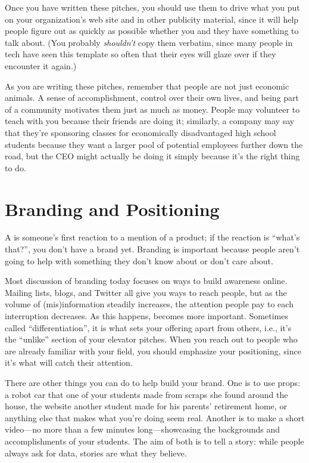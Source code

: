 Once you have written these pitches, you should use them to drive what
you put on your organization's web site and in other publicity material,
since it will help people figure out as quickly as possible whether you
and they have something to talk about. (You probably \emph{shouldn't} copy
them verbatim, since many people in tech have seen this template so
often that their eyes will glaze over if they encounter it again.)

As you are writing these pitches, remember that people are not just
economic animals. A sense of accomplishment, control over their own
lives, and being part of a community motivates them just as much as
money. People may volunteer to teach with you because their friends are
doing it; similarly, a company may say that they're sponsoring classes
for economically disadvantaged high school students because they want a
larger pool of potential employees further down the road, but the CEO
might actually be doing it simply because it's the right thing to do.

\section{Branding and Positioning}\label{s:marketing-branding}

A  is someone's first reaction to a mention
of a product; if the reaction is ``what's that?'', you don't have a brand
yet. Branding is important because people aren't going to help with
something they don't know about or don't care about.

Most discussion of branding today focuses on ways to build awareness
online. Mailing lists, blogs, and Twitter all give you ways to reach
people, but as the volume of (mis)information steadily increases, the
attention people pay to each interruption decreases. As this happens,
 becomes more important.
Sometimes called ``differentiation'', it is what sets your offering apart
from others, i.e., it's the ``unlike'' section of your elevator pitches.
When you reach out to people who are already familiar with your field,
you should emphasize your positioning, since it's what will catch their
attention.

There are other things you can do to help build your brand. One is to
use props: a robot car that one of your students made from scraps she
found around the house, the website another student made for his
parents' retirement home, or anything else that makes what you're
doing seem real. Another is to make a short video---no more than a few
minutes long---showcasing the backgrounds and accomplishments of your
students. The aim of both is to tell a story: while people always ask
for data, stories are what they believe.

